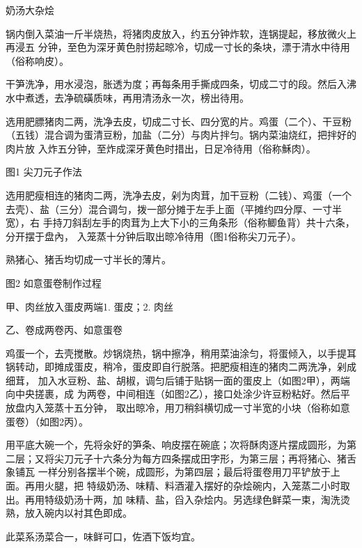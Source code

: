 \begin{recipe}{奶汤大杂烩}

\ingredients


\preparation

\step
锅内倒入菜油一斤半烧热，将猪肉皮放入，约五分钟炸软，连锅提起，移放微火上再浸五
分钟，至色为深牙黄色肘捞起晾冷，切成一寸长的条块，漂于清水中待用（俗称响皮）。

\step 干笋洗净，用水浸泡，胀透为度；再每条用手撕成四条，切成二寸的段。然后入沸
水中煮透，去净硫磺质味，再用清汤永一次，榜出待用。

\step 选用肥膘猪肉二两，洗净去皮，切成二寸长、四分宽的片。鸡蛋（二个）、干豆粉
（五钱）混合调为蛋清豆粉，加盐（二分）与肉片拌匀。锅内菜油烧红，把拌好的肉片放
入炸五分钟，至炸成深牙黄色时措出，日足冷待用（俗称穌肉）。

图1 尖刀元子作法

\step 选用肥瘦相连的猪肉二两，洗净去皮，剁为肉茸，加干豆粉（二钱）、鸡蛋（一个
去壳）、盐（三分）混合调匀，拨一部分摊于左手上面（平摊约四分厚、一寸半宽），右
手持刀斜刮左手的肉茸为上大下小的三角条形（俗称鲫鱼背）共十六条，分开摆于盘內，
入笼蒸十分钟后取出晾冷待用（图1俗称尖刀元子）。

\step 熟猪心、猪舌均切成一寸半长的薄片。

图2 如意蛋卷制作过程

甲、肉丝放入蛋皮两端1. 蛋皮；2. 肉丝

乙、卷成两卷丙、如意蛋卷

\step 鸡蛋一个，去壳搅散。炒锅烧热，锅中擦净，稍用菜油涂匀，将蛋倾入，以手提耳
锅转动，即摊成蛋皮，稍冷，蛋皮即自行脱落。把肥瘦相连的猪肉二两洗净，剁成细茸，
加入水豆粉、盐、胡椒，调匀后铺于贴锅一面的蛋皮上（如图2甲），两端向中央搓裹，成
为两卷，中间相连（如图2乙），接口处涂少许豆粉粘好。然后平放盘内入笼蒸十五分钟，
取出晾冷，用刀稍斜横切成一寸半宽的小块（俗称如意蛋卷）（如图2丙）。

\step 用平底大碗一个，先将汆好的笋条、响皮摆在碗底；次将酥肉逐片摆成圆形，为第
二层；又将尖刀元子十六条分为每方四条摆成田字形，为第三层；再将猪心、猪舌象铺瓦
一样分别各摆半个碗，成圆形，为第四层；最后将蛋卷用刀平铲放于上面。再用火腿，把
特级奶汤、味精、料酒灌入摆好的杂烩碗内，入笼蒸二小时取出。再用特级奶汤十两，加
味精、盐，舀入杂烩内。另选绿色鲜菜一束，淘洗烫熟，放入碗内以衬其色即成。

\features

此菜系汤菜合一，味鲜可口，佐酒下饭均宜。

\end{recipe}

